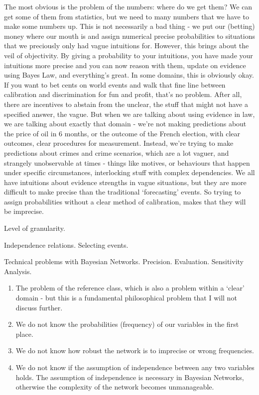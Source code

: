 The most obvious is the problem of the numbers: where do we get them? We can get some of them from statistics, but we need to many numbers that we have to make some numbers up. This is not necessarily a bad thing - we put our (betting) money where our mouth is and assign numerical precise probabilities to situations that we preciously only had vague intuitions for. However, this brings about the veil of objectivity. By giving a probability to your intuitions, you have made your intuitions more precise and you can now reason with them, update on evidence using Bayes Law, and everything's great. In some domains, this is obviously okay. If you want to bet cents on world events and walk that fine line between calibration and discrimination for fun and profit, that's no problem.  After all, there are incentives to abstain from the unclear, the stuff that might not have a specified answer, the vague. But when we are talking about using evidence in law, we are talking about exactly that domain - we're not making predictions about the price of oil in 6 months, or the outcome of the French election, with clear outcomes, clear procedures for measurement. Instead, we're trying to make predictions about crimes and crime scenarios, which are a lot vaguer, and strangely unobservable at times - things like motives, or behaviours that happen under specific circumstances, interlocking stuff with complex dependencies. We all have intuitions about evidence strengths in vague situations, but they are more difficult to make precise than the traditional `forecasting' events. So trying to assign probabilities without a clear method of calibration, makes that they will be imprecise.

Level of granularity.

Independence relations. Selecting events.

Technical problems with Bayesian Networks. Precision. Evaluation. Sensitivity Analysis.

\begin{enumerate}
\item The problem of the reference class, which is also a problem within a `clear' domain - but this is a fundamental philosophical problem that I will not discuss further.
\item We do not know the probabilities (frequency) of our variables in the first place.
\item We do not know how robust the network is to imprecise or wrong frequencies.
\item We do not know if the assumption of independence between any two variables holds. The assumption of independence is necessary in Bayesian Networks, otherwise the complexity of the network becomes unmanageable.
\end{enumerate}


